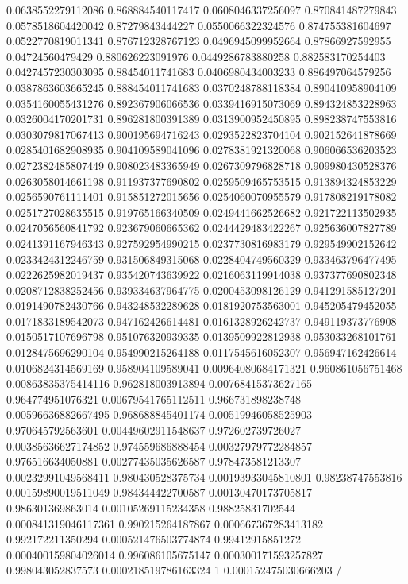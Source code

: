 \begin{table}
\begin{tabu}
\begin{sparkline}{10}
0.0638552279112086 0.868884540117417 0.0608046337256097 0.870841487279843 0.0578518604420042 0.87279843444227 0.0550066322324576 0.874755381604697 0.0522770819011341 0.876712328767123 0.0496945099952664 0.87866927592955 0.04724560479429 0.880626223091976 0.0449286783880258 0.882583170254403 0.0427457230303095 0.88454011741683 0.0406980434003233 0.886497064579256 0.0387863603665245 0.888454011741683 0.0370248788118384 0.890410958904109 0.0354160055431276 0.892367906066536 0.0339416915073069 0.894324853228963 0.0326004170201731 0.896281800391389 0.0313900952450895 0.898238747553816 0.0303079817067413 0.900195694716243 0.0293522823704104 0.902152641878669 0.0285401682908935 0.904109589041096 0.0278381921320068 0.906066536203523 0.0272382485807449 0.908023483365949 0.0267309796828718 0.909980430528376 0.0263058014661198 0.911937377690802 0.0259509465753515 0.913894324853229 0.0256590761111401 0.915851272015656 0.0254060070955579 0.917808219178082 0.0251727028635515 0.919765166340509 0.0249441662526682 0.921722113502935 0.0247056560841792 0.923679060665362 0.0244429483422267 0.925636007827789 0.0241391167946343 0.927592954990215 0.0237730816983179 0.929549902152642 0.0233424312246759 0.931506849315068 0.0228404749560329 0.933463796477495 0.0222625982019437 0.935420743639922 0.0216063119914038 0.937377690802348 0.0208712838252456 0.939334637964775 0.0200453098126129 0.941291585127201 0.0191490782430766 0.943248532289628 0.0181920753563001 0.945205479452055 0.0171833189542073 0.947162426614481 0.0161328926242737 0.949119373776908 0.0150517107696798 0.951076320939335 0.0139509922812938 0.953033268101761 0.0128475696290104 0.954990215264188 0.0117545616052307 0.956947162426614 0.0106824314569169 0.958904109589041 0.00964080684171321 0.960861056751468 0.00863835375414116 0.962818003913894 0.00768415373627165 0.964774951076321 0.00679541765112511 0.966731898238748 0.00596636882667495 0.968688845401174 0.00519946058525903 0.970645792563601 0.00449602911548637 0.972602739726027 0.00385636627174852 0.974559686888454 0.00327979772284857 0.976516634050881 0.00277435035626587 0.978473581213307 0.00232991049568411 0.980430528375734 0.00193933045810801 0.98238747553816 0.00159890019511049 0.984344422700587 0.00130470173705817 0.986301369863014 0.00105269115234358 0.98825831702544 0.000841319046117361 0.990215264187867 0.000667367283413182 0.992172211350294 0.000521476503774874 0.99412915851272 0.000400159804026014 0.996086105675147 0.000300171593257827 0.998043052837573 0.000218519786163324 1 0.000152475030666203 /
\end{sparkline}\\

\end{tabu}
\end{table}
